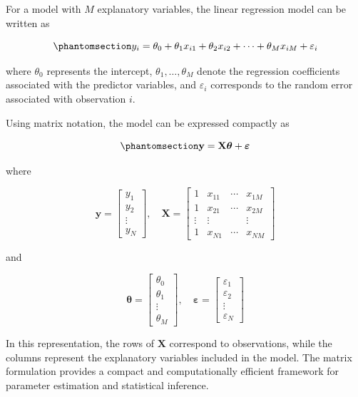 \documentclass[
  12pt,
  letterpaper,
]{book}
\begin{document}
For a model with \(M\) explanatory variables, the linear regression
model can be written as

\begin{equation}\phantomsection\label{eq-mlr-scalar}{
y_i
=
\theta_0
+
\theta_1 x_{i1}
+
\theta_2 x_{i2}
+
\cdots
+
\theta_M x_{iM}
+
\varepsilon_i
}\end{equation}

where \(\theta_0\) represents the intercept, \(\theta_1,\dots,\theta_M\)
denote the regression coefficients associated with the predictor
variables, and \(\varepsilon_i\) corresponds to the random error
associated with observation \(i\).

Using matrix notation, the model can be expressed compactly as

\begin{equation}\phantomsection\label{eq-mlr-matrix}{
\mathbf{y}
=
\mathbf{X}
\boldsymbol{\theta}
+
\boldsymbol{\varepsilon}
}\end{equation}

where

\[
\mathbf{y}
=
\begin{bmatrix}
y_1 \\
y_2 \\
\vdots \\
y_N
\end{bmatrix},
\quad
\mathbf{X}
=
\begin{bmatrix}
1 & x_{11} & \cdots & x_{1M} \\
1 & x_{21} & \cdots & x_{2M} \\
\vdots & \vdots & & \vdots \\
1 & x_{N1} & \cdots & x_{NM}
\end{bmatrix}
\]

and

\[
\boldsymbol{\theta}
=
\begin{bmatrix}
\theta_0 \\
\theta_1 \\
\vdots \\
\theta_M
\end{bmatrix},
\quad
\boldsymbol{\varepsilon}
=
\begin{bmatrix}
\varepsilon_1 \\
\varepsilon_2 \\
\vdots \\
\varepsilon_N
\end{bmatrix}
\]

In this representation, the rows of \(\mathbf{X}\) correspond to
observations, while the columns represent the explanatory variables
included in the model. The matrix formulation provides a compact and
computationally efficient framework for parameter estimation and
statistical inference.
\end{document}
